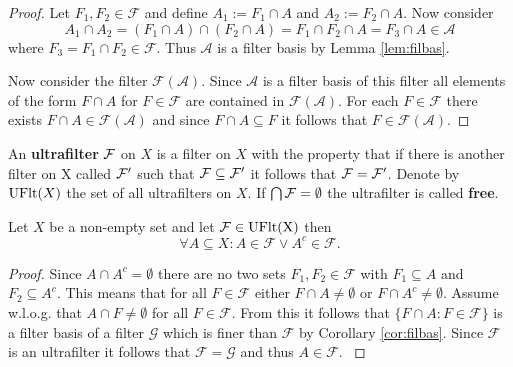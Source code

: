 \begin{proof}
  Let $F_1, F_2 \in \mathcal{F}$ and define $A_1 := F_1 \cap A$ and $A_2 := F_2 \cap A$. Now consider
  \begin{equation*}
    A_1 \cap A_2 = (F_1 \cap A) \cap (F_2 \cap A) = F_1 \cap F_2 \cap A = F_3 \cap A \in \mathcal{A}
  \end{equation*}
  where $F_3 = F_1 \cap F_2 \in \mathcal{F}$. Thus $\mathcal{A}$ is a filter basis by Lemma \ref{lem:filbas}.

  Now consider the filter $\mathcal{F}(\mathcal{A})$. Since $\mathcal{A}$ is a filter basis of this filter all elements of the form $F \cap A$ for $F\in\mathcal{F}$ are contained in $\mathcal{F}(\mathcal{A})$. For each $F\in\mathcal{F}$ there exists $F\cap A\in \mathcal{F}(\mathcal{A})$ and since $F\cap A \subseteq F$ it follows that $F\in \mathcal{F}(\mathcal{A})$. 
\end{proof}

\begin{defin} 
  An \textbf{ultrafilter} $\mathcal{F}$ on $X$ is a filter on $X$ with the property that if there is another filter on X called $\mathcal{F}'$ such that $\mathcal{F} \subseteq \mathcal{F}'$ it follows that $\mathcal{F} = \mathcal{F}'$. Denote by ${\rm UFlt}(X)$ the set of all ultrafilters on $X$.
  If $\bigcap \mathcal{F} = \emptyset$ the ultrafilter is called \textbf{free}.
\end{defin}

\begin{lemma}\label{lem:ufltlemma}
  Let $X$ be a non-empty set and let $\mathcal{F} \in {\rm UFlt(X)}$ then
  \begin{equation*}
    \forall A \subseteq X\colon A \in \mathcal{F} \lor A^c \in \mathcal{F}.
  \end{equation*}
\end{lemma}

\begin{proof}
  Since $A \cap A^c = \emptyset$ there are no two sets $F_1, F_2 \in \mathcal{F}$ with $F_1 \subseteq A$ and $F_2 \subseteq A^c$. This means that for all $F \in \mathcal{F}$ either $F \cap A \neq \emptyset$ or $F \cap A^c \neq \emptyset$. Assume w.l.o.g. that $A \cap F \neq \emptyset$ for all $F \in \mathcal{F}$. From this it follows that $\{F \cap A\colon F\in \mathcal{F}\}$ is a filter basis of a filter $\mathcal{G}$ which is finer than $\mathcal{F}$ by Corollary \ref{cor:filbas}. Since $\mathcal{F}$ is an ultrafilter it follows that $\mathcal{F} = \mathcal{G}$ and thus $A \in \mathcal{F}$. \cite[5.12 Satz]{BvQMT}
\end{proof}


